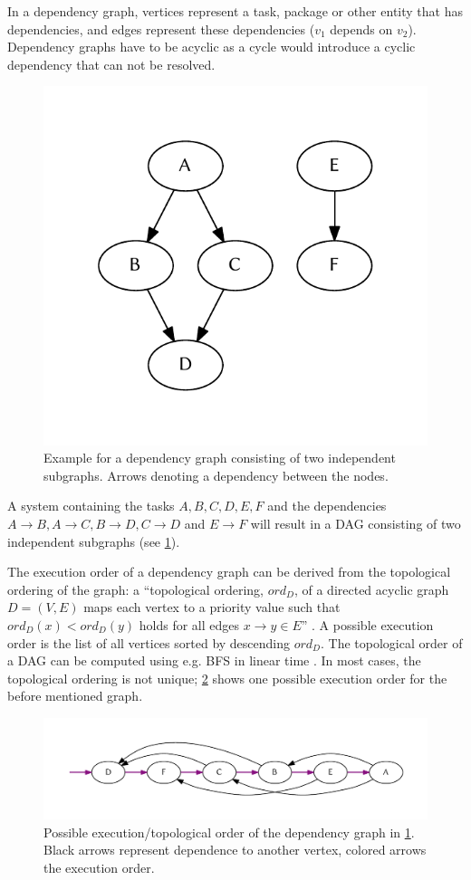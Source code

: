     In a dependency graph, vertices represent a task, package or other entity that has dependencies, and edges represent these dependencies ($v_1$ depends on $v_2$). Dependency graphs have to be acyclic as a cycle would introduce a cyclic dependency that can not be resolved.

    \begin{figure}[!htb]
      \centering
      \includegraphics[width = 0.44694533762057875\linewidth]{figures/unordered-graph.pdf}
      \caption{\label{fig:graph:unordered}Example for a dependency graph consisting of two independent subgraphs. Arrows denoting a dependency between the nodes.}
    \end{figure}

    A system containing the tasks $A, B, C, D, E, F$ and the dependencies $A\rightarrow B, A\rightarrow C, B\rightarrow D, C\rightarrow D$ and $E\rightarrow F$ will result in a \ac{DAG} consisting of two independent subgraphs (see \cref{fig:graph:unordered}).

    The execution order of a dependency graph can be derived from the topological ordering of the graph: a ``topological ordering, $ord_D$, of a directed acyclic graph $D = (V, E)$ maps each vertex to a priority value such that $ord_{D}(x) < ord_{D}(y)$ holds for all edges $x \rightarrow y \in E$'' \citep{pearce2007dynamic}. A possible execution order is the list of all vertices sorted by descending $ord_D$. The topological order of a \ac{DAG} can be computed using e.g. \ac{BFS} in linear time \citep{cormen2001introduction}. In most cases, the topological ordering is not unique; \cref{fig:graph:ordered} shows one possible execution order for the before mentioned graph.

    \begin{figure}[!htb]
      \centering
      \includegraphics[width = 1\linewidth]{figures/ordered-graph.pdf}
      \caption{\label{fig:graph:ordered}Possible execution/topological order of the dependency graph in \cref{fig:graph:unordered}. Black arrows represent dependence to another vertex, colored arrows the execution order.}
    \end{figure}

